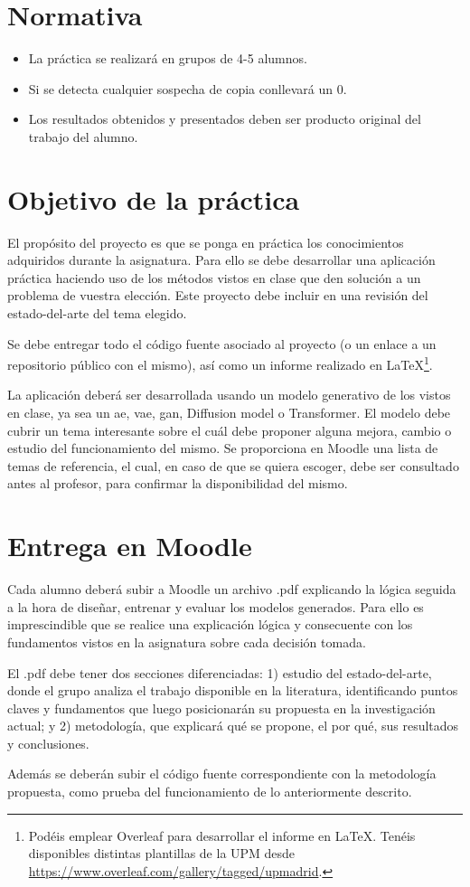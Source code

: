 \documentclass[a4paper]{article}
\begin{document}
\section*{Normativa}

\begin{itemize}
    \item La práctica se realizará en grupos de 4-5 alumnos.
    \item Si se detecta cualquier sospecha de copia conllevará un 0.
    \item Los resultados obtenidos y presentados deben ser producto original del trabajo del alumno.
\end{itemize}

\section{Objetivo de la práctica}
El propósito del proyecto es que se ponga en práctica los conocimientos adquiridos durante la asignatura. Para ello se debe desarrollar una aplicación práctica haciendo uso de los métodos vistos en clase que den solución a un problema de vuestra elección. Este proyecto debe incluir en una revisión del estado-del-arte del tema elegido.

Se debe entregar todo el código fuente asociado al proyecto (o un enlace a un repositorio público con el mismo), así como un informe realizado en \LaTeX\footnote{Podéis emplear Overleaf para desarrollar el informe en \LaTeX. Tenéis disponibles distintas plantillas de la UPM desde \url{https://www.overleaf.com/gallery/tagged/upmadrid}.}.

La aplicación deberá ser desarrollada usando un modelo generativo de los vistos en clase, ya sea un \gls{ae}, \gls{vae}, \gls{gan}, Diffusion model o Transformer. El modelo debe cubrir un tema interesante sobre el cuál debe proponer alguna mejora, cambio o estudio del funcionamiento del mismo. Se proporciona en Moodle una lista de temas de referencia, el cual, en caso de que se quiera escoger, debe ser consultado antes al profesor, para confirmar la disponibilidad del mismo.

\section{Entrega en Moodle}
Cada alumno deberá subir a Moodle un archivo .pdf explicando la lógica seguida a la hora de diseñar, entrenar y evaluar los modelos generados. Para ello es imprescindible que se realice una explicación lógica y consecuente con los fundamentos vistos en la asignatura sobre cada decisión tomada.

El .pdf debe tener dos secciones diferenciadas: 1) estudio del estado-del-arte, donde el grupo analiza el trabajo disponible en la literatura, identificando puntos claves y fundamentos que luego posicionarán su propuesta en la investigación actual; y 2) metodología, que explicará qué se propone, el por qué, sus resultados y conclusiones.

Además se deberán subir el código fuente correspondiente con la metodología propuesta, como prueba del funcionamiento de lo anteriormente descrito.
\end{document}
